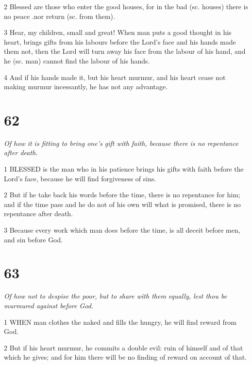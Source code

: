 \par 2 Blessed are those who enter the good houses, for in the bad (sc. houses) there is no peace .nor return (sc. from them).

\par 3 Hear, my children, small and great! When man puts a good thought in his heart, brings gifts from his labours before the Lord's face and his hands made them not, then the Lord will turn away his face from the labour of his hand, and he (sc. man) cannot find the labour of his hands.

\par 4 And if his hands made it, but his heart murmur, and his heart cease not making murmur incessantly, he has not any advantage.

\chapter{62}

\par \textit{Of how it is fitting to bring one's gift with faith, because there is no repentance after death.}

\par 1 BLESSED is the man who in his patience brings his gifts with faith before the Lord's face, because he will find forgiveness of sins.

\par 2 But if he take back his words before the time, there is no repentance for him; and if the time pass and he do not of his own will what is promised, there is no repentance after death.

\par 3 Because every work which man does before the time, is all deceit before men, and sin before God.



\chapter{63}

\par \textit{Of how not to despise the poor, but to share with them equally, lest thou be murmured against before God.}

\par 1 WHEN man clothes the naked and fills the hungry, he will find reward from God.

\par 2 But if his heart murmur, he commits a double evil: ruin of himself and of that which he gives; and for him there will be no finding of reward on account of that.

